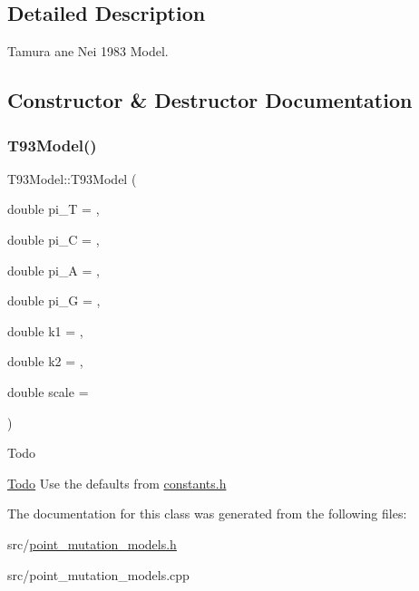 \subsection{Detailed Description}
Tamura ane Nei 1983 Model. 

\subsection{Constructor \& Destructor Documentation}
\mbox{\label{classrcombinator_1_1T93Model_ad975a4779689bb7ea958be8d956c31ed}} 
\subsubsection{\texorpdfstring{T93\+Model()}{T93Model()}}
{\footnotesize\ttfamily T93\+Model\+::\+T93\+Model (\begin{DoxyParamCaption}\item[{double}]{pi\+\_\+T = {},  }\item[{double}]{pi\+\_\+C = {},  }\item[{double}]{pi\+\_\+A = {},  }\item[{double}]{pi\+\_\+G = {},  }\item[{double}]{k1 = {},  }\item[{double}]{k2 = {},  }\item[{double}]{scale = {} }\end{DoxyParamCaption})}

\begin{DoxyRefDesc}{Todo}
\item[\mbox{\hyperlink{todo__todo000003}{Todo}}]Use the defaults from \mbox{\hyperlink{constants_8h}{constants.\+h}} \end{DoxyRefDesc}


The documentation for this class was generated from the following files\+:\begin{DoxyCompactItemize}
\item 
src/\mbox{\hyperlink{point__mutation__models_8h}{point\+\_\+mutation\+\_\+models.\+h}}\item 
src/point\+\_\+mutation\+\_\+models.\+cpp\end{DoxyCompactItemize}
